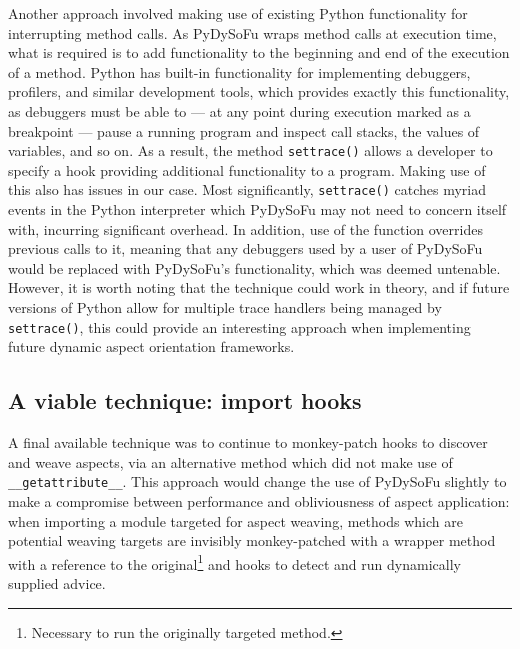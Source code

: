 Another approach involved making use of existing Python functionality for
interrupting method calls. As PyDySoFu wraps method calls at execution time,
what is required is to add functionality to the beginning and end of the
execution of a method. Python has built-in functionality for implementing
debuggers, profilers, and similar development tools, which provides exactly this
functionality, as debuggers must be able to --- at any point during execution
marked as a breakpoint --- pause a running program and inspect call stacks, the
values of variables, and so on. As a result, the method \lstinline{settrace()}
allows a developer to specify a hook providing additional functionality to a
program. Making use of this also has issues in our case. Most significantly,
\lstinline{settrace()} catches myriad events in the Python interpreter which
PyDySoFu may not need to concern itself with, incurring significant overhead. In
addition, use of the function overrides previous calls to it, meaning that any
debuggers used by a user of PyDySoFu would be replaced with PyDySoFu's
functionality, which was deemed untenable. However, it is worth noting that the
technique could work in theory, and if future versions of Python allow for
multiple trace handlers being managed by \lstinline{settrace()}, this could
provide an interesting approach when implementing future dynamic aspect
orientation frameworks.

\subsection{A viable technique: import hooks}\label{subsec:pdsf3importhookdiscussion}

A final available technique was to continue to monkey-patch hooks to discover
and weave aspects, via an alternative method which did not make use of
\lstinline{__getattribute__}. This approach would change the use of PyDySoFu
slightly to make a compromise between performance and obliviousness of aspect
application: when importing a module targeted for aspect weaving, methods
which are potential weaving targets are invisibly monkey-patched with a wrapper
method with a reference to the original\footnote{Necessary to run the originally
targeted method.} and hooks to detect and run dynamically supplied advice.

